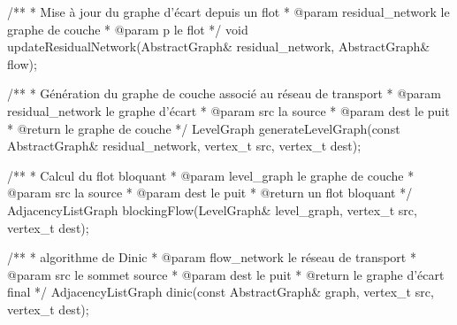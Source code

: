 /**
 * Mise à jour du graphe d'écart depuis un flot
 * @param residual_network le graphe de couche
 * @param p le flot
 */
void
updateResidualNetwork(AbstractGraph& residual_network, AbstractGraph& flow);

/**
 * Génération du graphe de couche associé au réseau de transport
 * @param residual_network le graphe d'écart
 * @param src la source
 * @param dest le puit
 * @return le graphe de couche
 */
LevelGraph
generateLevelGraph(const AbstractGraph& residual_network, vertex_t src,
    vertex_t dest);

/**
 * Calcul du flot bloquant
 * @param level_graph le graphe de couche
 * @param src la source
 * @param dest le puit
 * @return un flot bloquant
 */
AdjacencyListGraph
blockingFlow(LevelGraph& level_graph, vertex_t src, vertex_t dest);


/**
 * algorithme de Dinic
 * @param flow_network le réseau de transport
 * @param src le sommet source
 * @param dest le puit
 * @return le graphe d'écart final
 */
AdjacencyListGraph
dinic(const AbstractGraph& graph, vertex_t src, vertex_t dest);







